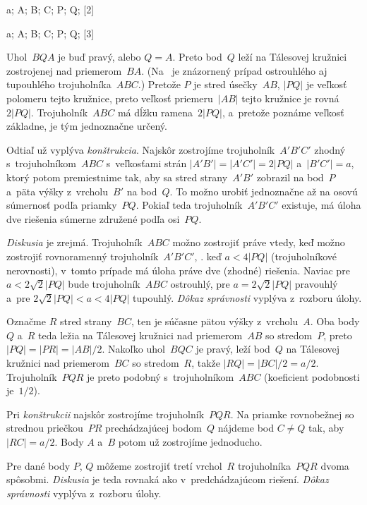 {%
\fontplace
\tpoint a;
\bpoint A; \rtpoint B; \ltpoint C;
\rpoint P; \lpoint Q;
[2]

\fontplace
\tpoint a;
\lBpoint A; \rtpoint B; \ltpoint C;
\tpoint P; \bpoint Q;
[3]

Uhol~$BQA$ je buď pravý, alebo $Q=A$. Preto bod~$Q$ leží na
Tálesovej kružnici zostrojenej nad priemerom~$BA$. (Na \obr\ je
znázornený prípad ostrouhlého aj tupouhlého trojuholníka~$ABC$.)
Pretože $P$ je stred úsečky~$AB$, $|PQ|$ je veľkosť polomeru
tejto kružnice, preto veľkosť priemeru~$|AB|$ tejto kružnice je
rovná~$2|PQ|$. Trojuholník~$ABC$ má dĺžku ramena~$2|PQ|$,
a~pretože poznáme veľkosť základne, je tým jednoznačne určený.

\medskip
\line{\quad\inspicture-!\hfil\inspicture-!\quad}
\nobreak\centerline\Obr

\medbreak
Odtiaľ už vyplýva {\it konštrukcia\/}. Najskôr zostrojíme trojuholník~$A'B'C'$
zhodný s~trojuholníkom~$ABC$ s~veľkosťami strán
$|A'B'|=|A'C'|=2|PQ|$ a~$|B'C'|=a$, ktorý potom premiestnime tak,
aby sa stred strany~$A'B'$ zobrazil na bod~$P$ a~päta výšky
z~vrcholu~$B'$ na bod~$Q$. To možno urobiť jednoznačne až
na osovú súmernosť podľa priamky~$PQ$. Pokiaľ teda trojuholník~$A'B'C'$
existuje, má úloha dve riešenia súmerne združené podľa
osi~$PQ$.

\smallskip
{\it Diskusia\/} je zrejmá. Trojuholník~$ABC$ možno zostrojiť práve
vtedy, keď možno zostrojiť rovnoramenný trojuholník~$A'B'C'$, \tj. keď
$a<4|PQ|$ (trojuholníkové nerovnosti), v~tomto prípade má úloha
práve dve (zhodné) riešenia. Naviac pre $a<2\sqrt2|PQ|$ bude trojuholník~$ABC$
ostrouhlý, pre $a=2\sqrt2|PQ|$ pravouhlý a~pre $2\sqrt2|PQ|<a<4|PQ|$ tupouhlý.
{\it Dôkaz správnosti\/} vyplýva z~rozboru úlohy.

\ineriesenie
Označme $R$ stred strany~$BC$, ten je súčasne pätou výšky
z~vrcholu~$A$. Oba body $Q$ a~$R$ teda ležia na Tálesovej
kružnici nad priemerom~$AB$ so stredom~$P$, preto
$|PQ|=|PR|=|AB|/2$. Nakoľko uhol~$BQC$ je pravý, leží bod~$Q$
na Tálesovej kružnici nad priemerom~$BC$ so stredom~$R$, takže
$|RQ|=|BC|/2=a/2$. Trojuholník~$PQR$ je preto podobný s~trojuholníkom~$ABC$
(koeficient podobnosti je~$1/2$).

\smallskip
Pri {\it konštrukcii\/} najskôr zostrojíme trojuholník~$PQR$. Na
priamke rovnobežnej so strednou priečkou~$PR$ prechádzajúcej bodom~$Q$
nájdeme bod $C\ne Q$ tak, aby $|RC|=a/2$. Body $A$ a~$B$ potom už zostrojíme jednoducho.

\smallskip
Pre dané body $P$, $Q$ môžeme zostrojiť tretí vrchol~$R$ trojuholníka~$PQR$
dvoma spôsobmi. {\it Diskusia\/} je teda rovnaká ako
v~predchádzajúcom riešení. {\it Dôkaz správnosti\/} vyplýva z~rozboru
úlohy.}

